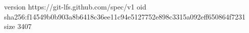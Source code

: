 version https://git-lfs.github.com/spec/v1
oid sha256:f14549b0b903a8b6418c36ee11c94e5127752e898c3315a092eff650864f7231
size 3407
